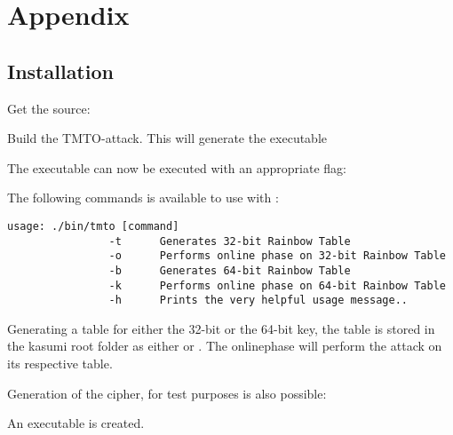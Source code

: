 \chapter{Appendix}
\section{Installation}
\label{sec:inst}
Get the source:

\quad{}

Build the TMTO-attack. This will generate the executable

\quad{}

The executable  can now be executed with an appropriate
flag:

\quad{}

The following commands is available to use with :
\begin{verbatim}
usage: ./bin/tmto [command] 
                -t      Generates 32-bit Rainbow Table 
                -o      Performs online phase on 32-bit Rainbow Table 
                -b      Generates 64-bit Rainbow Table 
                -k      Performs online phase on 64-bit Rainbow Table 
                -h      Prints the very helpful usage message.. 
\end{verbatim}

Generating a table for either the 32-bit or the 64-bit key, the table
is stored in the kasumi root folder as either  or
. The onlinephase will perform the attack on its
respective table.

Generation of the cipher, for test purposes is also possible:

\quad{}

An executable  is created. 

